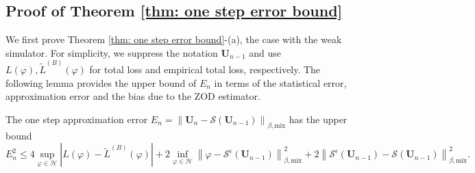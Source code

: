 \documentclass[twoside,11pt]{article}
\newcommand{\1}{\mathbf{1}}
\numberwithin{equation}{section}
\newcommand{\normmix}[1]{\left\|#1\right\|_{\beta, \text{mix}}}
\begin{document}
\subsection{Proof of Theorem \ref{thm: one step error bound}}\label{proof sec: one step error bound}
We first prove Theorem \ref{thm: one step error bound}-(a), the case with the weak simulator.
For simplicity, we suppress the notation $\mathbf{U}_{n-1}$ and use $L(\varphi), \tilde L^{(B)}(\varphi)$ for total loss and empirical total loss, respectively. The following lemma provides the upper bound of $E_n$ in terms of the statistical error, approximation error and the bias due to the ZOD estimator.
\begin{lemma}\label{lemma: one step error decom}
    The one step approximation error $E_n = \normmix{\mathbf{U}_n - \mathcal{S}(\mathbf{U}_{n-1})}$ has the upper bound
    \begin{equation}
        E_n^2 \le 4\sup_{\varphi \in \mathcal{H}}|L(\varphi) - \tilde L^{(B)}(\varphi)| + 2 \inf_{\varphi\in \mathcal{H}} \normmix{\varphi - \mathcal{S}^\epsilon(\mathbf{U}_{n-1})}^2+  2 \normmix{\mathcal{S}^\epsilon(\mathbf{U}_{n-1}) - \mathcal{S}(\mathbf{U}_{n-1})}^2.
    \end{equation}
\end{lemma}
\end{document}
